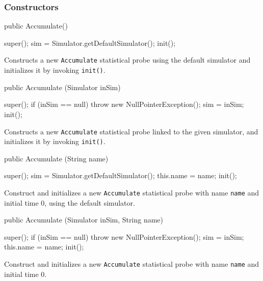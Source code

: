 \subsubsection* {Constructors}
\begin{code}

   public Accumulate() \begin{hide} {
      super();
      sim = Simulator.getDefaultSimulator();
      init();
   } \end{hide}
\end{code}
  \begin{tabb}  Constructs a new \texttt{Accumulate} statistical probe using the
  default simulator and initializes it by invoking \texttt{init()}.
 \end{tabb}
\begin{code}

   public Accumulate (Simulator inSim) \begin{hide} {
      super();
      if (inSim == null)
          throw new NullPointerException();
      sim = inSim;
      init();
   } \end{hide}
\end{code}
  \begin{tabb}  Constructs a new \texttt{Accumulate} statistical probe linked to
    the given simulator,
   and initializes it by invoking \texttt{init()}.
 \end{tabb}
 \begin{htmlonly}
\end{htmlonly}
\begin{code}

   public Accumulate (String name) \begin{hide} {
      super();
      sim = Simulator.getDefaultSimulator();
      this.name = name;
      init();
   } \end{hide}
\end{code}
  \begin{tabb}  Construct and initializes a new \texttt{Accumulate}
   statistical probe with name \texttt{name} and initial time 0, using the default simulator.
 \end{tabb}
\begin{code}

   public Accumulate (Simulator inSim, String name) \begin{hide} {
      super();
      if (inSim == null)
          throw new NullPointerException();
      sim = inSim;
      this.name = name;
      init();
   } \end{hide}
\end{code}
  \begin{tabb}  Construct and initializes a new \texttt{Accumulate}
   statistical probe with name \texttt{name} and initial time 0.
 \end{tabb}
\begin{htmlonly}
\end{htmlonly}

